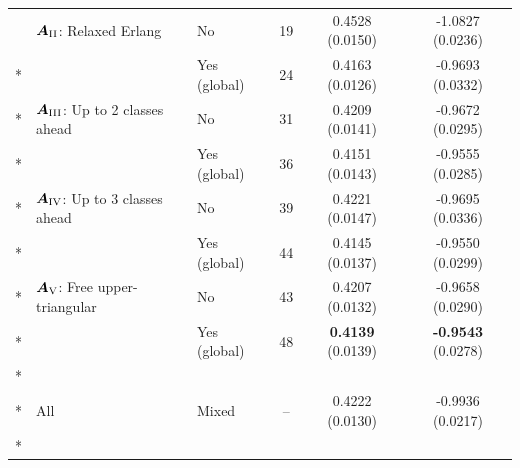 \begin{longtable}[t]{>{}lllccc}
\addlinespace[0.5em]
\nopagebreak
\hspace{1em} & $\bm{A}_{\RN{2}}$: Relaxed Erlang & No & 19 & 0.4528 (0.0150) & -1.0827 (0.0236)\\*
\nopagebreak
\hspace{1em} &  & Yes (global) & 24 & 0.4163 (0.0126) & -0.9693 (0.0332)\\*

\addlinespace[0.5em]
\nopagebreak
\hspace{1em} & $\bm{A}_{\RN{3}}$: Up to 2 classes ahead & No & 31 & 0.4209 (0.0141) & -0.9672 (0.0295)\\*
\nopagebreak
\hspace{1em} &  & Yes (global) & 36 & 0.4151 (0.0143) & -0.9555 (0.0285)\\*

\addlinespace[0.5em]
\nopagebreak
\hspace{1em} & $\bm{A}_{\RN{4}}$: Up to 3 classes ahead & No & 39 & 0.4221 (0.0147) & -0.9695 (0.0336)\\*
\nopagebreak
\hspace{1em} &  & Yes (global) & 44 & 0.4145 (0.0137) & -0.9550 (0.0299)\\*

\addlinespace[0.5em]
\nopagebreak
\hspace{1em} & $\bm{A}_{\RN{5}}$: Free upper-triangular & No & 43 & 0.4207 (0.0132) & -0.9658 (0.0290)\\*
\nopagebreak
\hspace{1em} &  & Yes (global) & 48 & \textbf{0.4139} (0.0139) & \textbf{-0.9543} (0.0278)\\*
\cmidrule{1-6}
\addlinespace[0.3em]
\multicolumn{6}{l}{\textbf{\textbf{Ensemble}}}\\*
\hspace{1em} & All & Mixed & -- & 0.4222 (0.0130) & -0.9936 (0.0217)\\*
\end{longtable}
